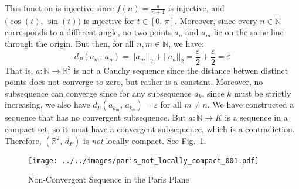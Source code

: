 \documentclass{article}
\theoremstyle{normal}
\begin{document}
    This function is injective since $f(n)=\frac{\pi}{n+1}$ is injective, and
    $\big(\cos(t),\,\sin(t)\big)$ is injective for $t\in[0,\,\pi]$. Moreover,
    since every $n\in\mathbb{N}$ corresponds to a different angle, no
    two points $a_{n}$ and $a_{m}$ lie on the same line through the origin.
    But then, for all $n,m\in\mathbb{N}$, we have:
    \begin{equation}
        d_{P}(a_{m},\,a_{n})
        =||a_{m}||_{2}+||a_{n}||_{2}
        =\frac{\varepsilon}{2}+\frac{\varepsilon}{2}
        =\varepsilon
    \end{equation}
    That is, $a:\mathbb{N}\rightarrow\mathbb{R}^{2}$ is not a Cauchy sequence
    since the distance betwen distinct points does not converge to zero, but
    rather is a constant. Moreover, no subsequence can converge since for
    any subsequence $a_{k}$, since $k$ must be strictly increasing, we also
    have $d_{P}(a_{k_{m}},\,a_{k_{n}})=\varepsilon$ for all $m\ne{n}$.
    We have constructed a sequence that has no convergent subsequence.
    But $a:\mathbb{N}\rightarrow{K}$ is a sequence in a compact set, so it must
    have a convergent subsequence, which is a contradiction. Therefore,
    $(\mathbb{R}^{2},\,d_{P})$ is \textit{not} locally compact.
    See Fig.~\ref{fig:paris_not_locally_compact_001}.
    \begin{figure}
        \centering
        \texttt{[image: ../../images/paris\_not\_locally\_compact\_001.pdf]}
        \caption{Non-Convergent Sequence in the Paris Plane}
        \label{fig:paris_not_locally_compact_001}
    \end{figure}
\end{document}
